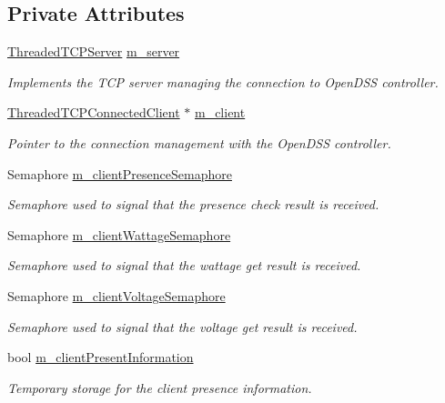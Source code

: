 \subsection*{Private Attributes}
\begin{DoxyCompactItemize}
\item 
\hyperlink{class_threaded_t_c_p_server}{Threaded\-T\-C\-P\-Server} \hyperlink{class_matlab_manager_a2eea12132471953cf6cdb6effb7233f9}{m\-\_\-server}
\begin{DoxyCompactList}\small\item\em Implements the T\-C\-P server managing the connection to Open\-D\-S\-S controller. \end{DoxyCompactList}\item 
\hyperlink{class_threaded_t_c_p_connected_client}{Threaded\-T\-C\-P\-Connected\-Client} $\ast$ \hyperlink{class_matlab_manager_a216ee97a37b033d6a02893206e1793e0}{m\-\_\-client}
\begin{DoxyCompactList}\small\item\em Pointer to the connection management with the Open\-D\-S\-S controller. \end{DoxyCompactList}\item 
Semaphore \hyperlink{class_matlab_manager_a97e67367dd6bf4b6976bcd2237277d46}{m\-\_\-client\-Presence\-Semaphore}
\begin{DoxyCompactList}\small\item\em Semaphore used to signal that the presence check result is received. \end{DoxyCompactList}\item 
Semaphore \hyperlink{class_matlab_manager_a476eb9e68029520e9032f58672b7829e}{m\-\_\-client\-Wattage\-Semaphore}
\begin{DoxyCompactList}\small\item\em Semaphore used to signal that the wattage get result is received. \end{DoxyCompactList}\item 
Semaphore \hyperlink{class_matlab_manager_a18a1ab2e178279313daf7a0790b91f04}{m\-\_\-client\-Voltage\-Semaphore}
\begin{DoxyCompactList}\small\item\em Semaphore used to signal that the voltage get result is received. \end{DoxyCompactList}\item 
bool \hyperlink{class_matlab_manager_acf28415517fd10ff8105e5ac80280a63}{m\-\_\-client\-Present\-Information}
\begin{DoxyCompactList}\small\item\em Temporary storage for the client presence information. \end{DoxyCompactList}\item 

\end{DoxyCompactItemize}

